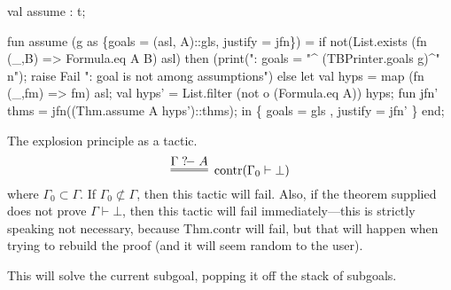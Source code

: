 \nwenddocs{}\plusendmoddef\nwstartdeflinemarkup{}\nwenddeflinemarkup
val assume : t;
\nwendcode{}\nwdocspar

\nwenddocs{}\plusendmoddef\nwstartdeflinemarkup{}\nwenddeflinemarkup
fun assume (g as \{goals = (asl, A)::gls, justify = jfn\}) =
  if not(List.exists (fn (_,B) => Formula.eq A B) asl)
  then
    (print(": goals = "^
           (TBPrinter.goals g)^"\\n");
     raise Fail ": goal is not among assumptions")
  else
    let
      val hyps = map (fn (_,fm) => fm) asl;
      val hyps' = List.filter (not o (Formula.eq A)) hyps;
      fun jfn' thms = jfn((Thm.assume A hyps')::thms);
    in
      \{ goals = gls
      , justify = jfn' \}
    end;
\eatline
{}\nwendcode{}\nwdocspar
\begin{node}
The explosion principle as a tactic.
\begin{equation}
\vcenter{\infer=[\mbox{contr}(\Gamma_{0}\vdash\bot)]{}{\Gamma\gdash A}}
\end{equation}
where $\Gamma_{0}\subset\Gamma$. If $\Gamma_{0}\not\subset\Gamma$,
then this tactic will fail. Also, if the theorem supplied does not
prove $\Gamma\vdash\bot$, then this tactic will fail
immediately---this is strictly speaking not necessary, because
{\Tt{}Thm.contr\nwendquote} will fail, but that will happen when trying to rebuild
the proof (and it will seem random to the user).

This will solve the current subgoal, popping it off the stack of
subgoals.
\end{node}

